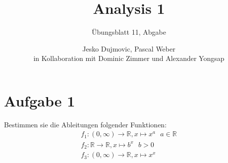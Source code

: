 \documentclass{scrreprt}
\newcommand{\RR}{\mathbb{R}}
\newcommand{\round}[1]{\left(#1\right)}
\begin{document}
	\title{Analysis 1}
    \author{Jesko Dujmovic, Pascal Weber\\in Kollaboration mit Dominic Zimmer und Alexander Yongsap}
 	\subtitle{Übungsblatt 11, Abgabe}
 	\publishers{Übungsgruppe: Rami Ahmad}
  	\maketitle 


\section*{Aufgabe 1}
Bestimmen sie die Ableitungen folgender Funktionen:
\begin{align*}
    f_1 \colon \round{0,\infty} \to \RR, x \mapsto x^a ~~~ a \in \RR\\
    f_2 \colon \RR \to \RR, x \mapsto b^x~~~ b >0\\
    f_3 \colon \round{0,\infty} \to \RR, x \mapsto x^x
\end{align*}
\end{document}
